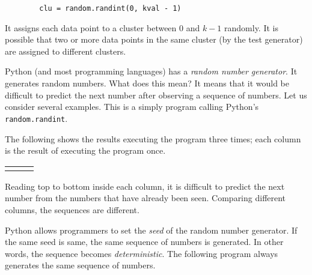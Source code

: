 \begin{verbatim}
        clu = random.randint(0, kval - 1)
\end{verbatim}


It assigns each data point to a cluster between $0$ and $k-1$
randomly.  It is possible that two or more data points in the same
cluster (by the test generator) are assigned to different clusters.

Python (and most programming languages) has a {\it random number
  generator}.  It generates random numbers. What does this mean?  It
means that it would be difficult to predict the next number after
observing a sequence of numbers.  Let us consider several
examples. This is a simply program calling Python's {\tt
  random.randint}.

\resetlinenumber[1]
\linenumbers
\begin{tt}
  
\end{tt}
\nolinenumbers

The following shows the results
executing the program three times; each column is the result of
executing the program once.

\begin{tabular}{p{1in}p{1in}p{1in}}
\begin{tt}
  
\end{tt}
&
\begin{tt}
  
\end{tt}

&
\begin{tt}
  
\end{tt}

\end{tabular}

Reading top to bottom inside each column, it is difficult to predict
the next number from the numbers that have already been seen.
Comparing different columns, the sequences are different.

Python allows programmers to set  the {\it seed} of the random number generator.
If the same seed is same, the same sequence of numbers is generated.
In other words, the sequence becomes {\it deterministic}.  The following program
always generates the same sequence of numbers.


